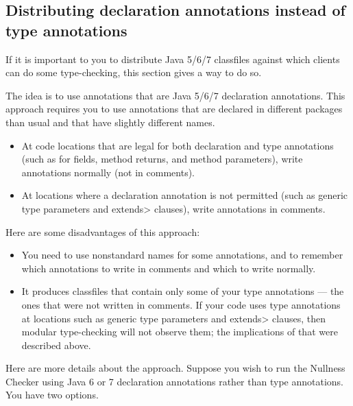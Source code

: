 \subsection{Distributing declaration annotations instead of type annotations\label{declaration-annotations-for-java7}}

If it is important to you to distribute Java 5/6/7 classfiles against which
clients can do some type-checking, this section gives a way to do so.

The idea is to
use annotations that are Java 5/6/7 declaration annotations.
This approach requires you to use annotations that are declared in
different packages than usual and that have slightly different names.

\begin{itemize}
\item
At code locations that are legal for both declaration and type
annotations (such as for fields, method returns, and method parameters),
write annotations normally (not in comments).
\item
At locations where a declaration annotation is not permitted
(such as generic type parameters and \<extends> clauses), write
annotations in comments.
\end{itemize}

Here are some disadvantages of this approach:

\begin{itemize}
\item
  You need to use nonstandard names for
  some annotations, and to remember which annotations to write in comments
  and which to write normally.
\item
  It produces classfiles that contain only some of your type annotations
  --- the ones that were not written in comments.
  If your code uses type annotations at
  locations such as generic type parameters and \<extends> clauses, then
  modular type-checking will not observe them;
  the implications of that were described above.
\end{itemize}


Here are more details about the approach.
Suppose you wish to run the Nullness Checker using Java 6 or 7
declaration annotations rather than type annotations.  You have two options.

